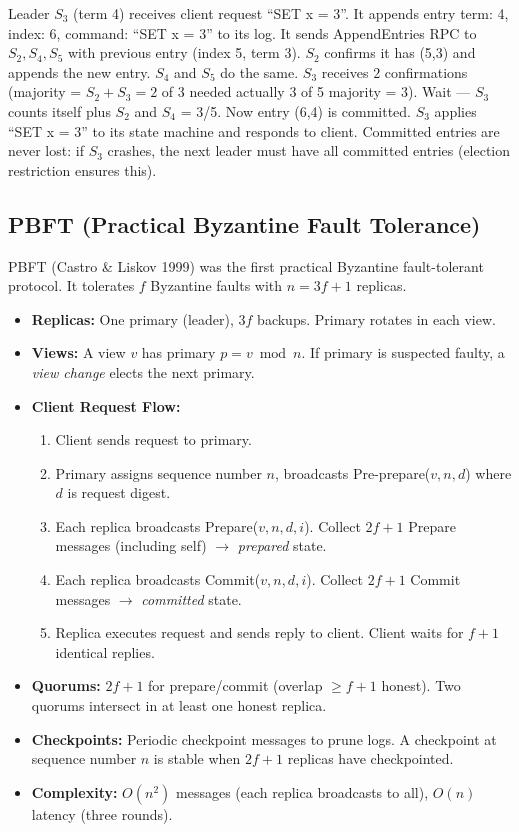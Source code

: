\begin{example}
Leader $S_3$ (term 4) receives client request ``SET x = 3''. It appends entry {term: 4, index: 6, command: ``SET x = 3''} to its log. It sends AppendEntries RPC to $S_2, S_4, S_5$ with previous entry (index 5, term 3). $S_2$ confirms it has (5,3) and appends the new entry. $S_4$ and $S_5$ do the same. $S_3$ receives $2$ confirmations (majority = $S_2 + S_3 = 2$ of 3 needed actually 3 of 5 majority = 3). Wait — $S_3$ counts itself plus $S_2$ and $S_4$ = 3/5. Now entry (6,4) is committed. $S_3$ applies ``SET x = 3'' to its state machine and responds to client. Committed entries are never lost: if $S_3$ crashes, the next leader must have all committed entries (election restriction ensures this).
\end{example}

\subsection{PBFT (Practical Byzantine Fault Tolerance)}
\label{sec:consensus:pbft}

PBFT (Castro \& Liskov 1999) was the first practical Byzantine fault-tolerant protocol. It tolerates $f$ Byzantine faults with $n = 3f+1$ replicas.

\begin{itemize}
\item \textbf{Replicas:} One primary (leader), $3f$ backups. Primary rotates in each view.
\item \textbf{Views:} A view $v$ has primary $p = v \bmod n$. If primary is suspected faulty, a \emph{view change} elects the next primary.
\item \textbf{Client Request Flow:}
\begin{enumerate}
\item Client sends request to primary.
\item Primary assigns sequence number $n$, broadcasts Pre-prepare($v, n, d$) where $d$ is request digest.
\item Each replica broadcasts Prepare($v, n, d, i$). Collect $2f+1$ Prepare messages (including self) $\to$ \emph{prepared} state.
\item Each replica broadcasts Commit($v, n, d, i$). Collect $2f+1$ Commit messages $\to$ \emph{committed} state.
\item Replica executes request and sends reply to client. Client waits for $f+1$ identical replies.
\end{enumerate}
\item \textbf{Quorums:} $2f+1$ for prepare/commit (overlap $\ge f+1$ honest). Two quorums intersect in at least one honest replica.
\item \textbf{Checkpoints:} Periodic checkpoint messages to prune logs. A checkpoint at sequence number $n$ is stable when $2f+1$ replicas have checkpointed.
\item \textbf{Complexity:} $O(n^2)$ messages (each replica broadcasts to all), $O(n)$ latency (three rounds).
\end{itemize}

